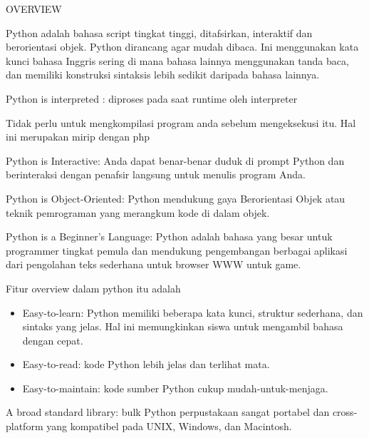 
\sloppy
\begin{center}{\fontsize{14pt}{14pt}\selectfont OVERVIEW \\}\end{center} \par
\vspace{14pt}
Python adalah bahasa script tingkat tinggi, ditafsirkan, interaktif dan berorientasi objek. Python dirancang agar mudah dibaca. Ini menggunakan kata kunci bahasa Inggris sering di mana bahasa lainnya menggunakan tanda baca, dan memiliki konstruksi sintaksis lebih sedikit daripada bahasa lainnya. \par
\noindent 
Python is interpreted : diproses pada saat runtime oleh interpreter \par
\noindent 
Tidak perlu untuk mengkompilasi program anda sebelum mengeksekusi itu. Hal ini merupakan mirip dengan php \par
\noindent 
Python is Interactive: Anda dapat benar-benar duduk di prompt Python dan berinteraksi dengan penafsir langsung untuk menulis program Anda. \par
\noindent 
Python is Object-Oriented: Python mendukung gaya Berorientasi Objek atau teknik pemrograman yang merangkum kode di dalam objek. \par
\noindent 
Python is a Beginner's Language: Python adalah bahasa yang besar untuk programmer tingkat pemula dan mendukung pengembangan berbagai aplikasi dari pengolahan teks sederhana untuk browser WWW untuk game. \par
\noindent 
Fitur overview dalam python itu adalah \par
\noindent 
\begin{itemize}
\item Easy-to-learn: Python memiliki beberapa kata kunci, struktur sederhana, dan sintaks yang jelas. $  $Hal ini memungkinkan siswa untuk mengambil bahasa dengan cepat. \par
\noindent 
\item Easy-to-read: kode Python lebih jelas dan terlihat mata. \par
\noindent 
\item Easy-to-maintain: kode sumber Python cukup mudah-untuk-menjaga.\end{itemize}
 \par
\vspace{12pt}
\noindent 
A broad standard library: bulk Python perpustakaan sangat portabel dan cross-platform yang kompatibel pada UNIX, Windows, dan Macintosh. \par
